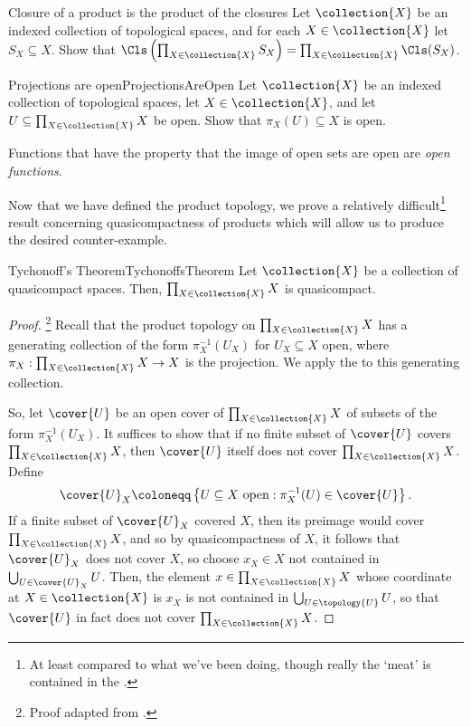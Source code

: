\begin{exr}{Closure of a product is the product of the closures}{}
Let $\collection{X}$ be an indexed collection of topological spaces, and for each $X\in \collection{X}$ let $S_X\subseteq X$.  Show that $\Cls \left( \prod _{X\in \collection{X}}S_X\right) =\prod _{X\in \collection{X}}\Cls (S_X)$.
\end{exr}
\begin{exr}{Projections are open}{ProjectionsAreOpen}
Let $\collection{X}$ be an indexed collection of topological spaces, let $X\in \collection{X}$, and let $U\subseteq \prod _{X\in \collection{X}}X$ be open.  Show that $\pi _X(U)\subseteq X$ is open.
\begin{rmk}
Functions that have the property that the image of open sets are open are \emph{open functions}.
\end{rmk}
\end{exr}

Now that we have defined the product topology, we prove a relatively difficult\footnote{At least compared to what we've been doing, though really the `meat' is contained in the .} result concerning quasicompactness of products which will allow us to produce the desired counter-example.
\begin{thm}{Tychonoff's Theorem}{TychonoffsTheorem}
Let $\collection{X}$ be a collection of quasicompact spaces.  Then, $\prod _{X\in \collection{X}}X$ is quasicompact.
\begin{proof}\footnote{Proof adapted from \cite[pg.~143]{Kelley}.}
Recall that the product topology on $\prod _{X\in \collection{X}}X$ has a generating collection of the form $\pi _X^{-1}(U_X)$ for $U_X\subseteq X$ open, where $\pi _X:\prod _{X\in \collection{X}}X\rightarrow X$ is the projection.  We apply the  to this generating collection.

So, let $\cover{U}$ be an open cover of $\prod _{X\in \collection{X}}X$ of subsets of the form $\pi _X^{-1}(U_X)$.  It suffices to show that if no finite subset of $\cover{U}$ covers $\prod _{X\in \collection{X}}X$, then $\cover{U}$ itself does not cover $\prod _{X\in \collection{X}}X$.  Define
\begin{equation}
\cover{U}_X\coloneqq \left\{ U\subseteq X\text{ open}:\pi _X^{-1}(U)\in \cover{U}\right\} .
\end{equation}
If a finite subset of $\cover {U}_X$ covered $X$, then its preimage would cover $\prod _{X\in \collection{X}}X$, and so by quasicompactness of $X$, it follows that $\cover{U}_X$ does not cover $X$, so choose $x_X\in X$ not contained in $\bigcup _{U\in \cover {U}_X}U$.  Then, the element $x\in \prod _{X\in \collection{X}}X$ whose coordinate at $X\in \collection{X}$ is $x_X$ is not contained in $\bigcup _{U\in \topology{U}}U$, so that $\cover{U}$ in fact does not cover $\prod _{X\in \collection{X}}X$.
\end{proof}
\end{thm}


